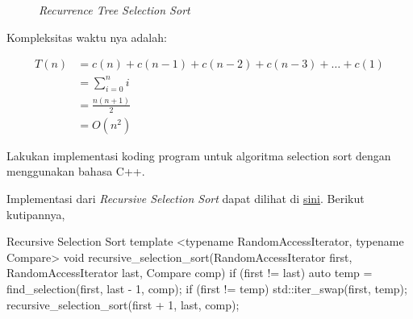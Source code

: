 \begin{figure}[H]
    \centering
    \caption{\textit{Recurrence Tree Selection Sort}}
    \label{fig:selsorttree}
\end{figure}

Kompleksitas waktu nya adalah:

\begin{align*}
    T(n)    & = c(n) + c(n - 1) + c(n - 2) + c(n - 3) + \ldots  + c(1) \\
            & = \sum_{i=0}^{n} i \\
            & = \frac{n(n + 1)}{2} \\
            & = O(n^2)
\end{align*}


\Problem Lakukan implementasi koding program untuk algoritma selection sort dengan menggunakan bahasa C++.

\TheSolution Implementasi dari \textit{Recursive Selection Sort} dapat dilihat di \href{https://github.com/okka-riswana/AnalgoKu/blob/8db63a0d830d90c0f0fba2e2cc53272ffe58b6e7/src/analgoku4/sorting.hpp#L216}{sini}. Berikut kutipannya,

\begin{code}[cpp]{Recursive Selection Sort}
template <typename RandomAccessIterator, typename Compare>
void recursive_selection_sort(RandomAccessIterator first,
                              RandomAccessIterator last,
                              Compare comp) {
  if (first != last) {
    auto temp = find_selection(first, last - 1, comp);
    if (first != temp) {
      std::iter_swap(first, temp);
    }
    recursive_selection_sort(first + 1, last, comp);
  }
}
\end{code}
